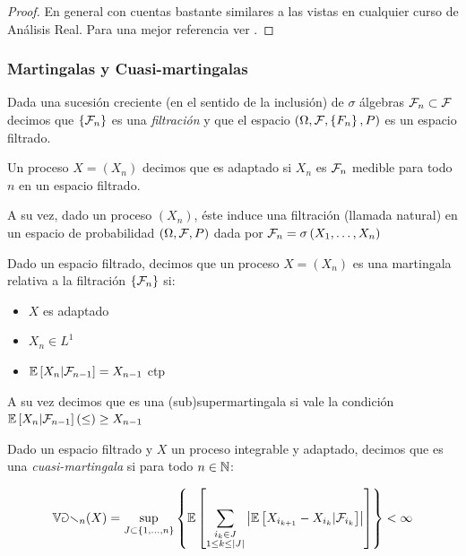 \begin{proof}
	En general con cuentas bastante similares a las vistas en cualquier curso de An\'alisis Real. Para una mejor referencia ver \cite{williams:1991}.
\end{proof}

\subsubsection{Martingalas y Cuasi-martingalas}

\begin{definition}
	Dada una sucesi\'on creciente (en el sentido de la inclusi\'on) de $\sigma$ \'algebras $\mathcal{F}_n \subset \mathcal{F}$ decimos que $\left\lbrace\mathcal{F}_n\right\rbrace$ es una \textit{filtraci\'on} y que el espacio $\left(\Omega, \mathcal{F}, \left\lbrace F_n\right\rbrace, P\right)$ es un espacio filtrado.
	
	Un proceso $X  = \left(X_n\right)$ decimos que es adaptado si $X_n $ es $\mathcal{F}_n$ medible para todo $n$ en un espacio filtrado.
	
	A su vez, dado un proceso $\left(X_n\right)$, \'este induce una filtraci\'on (llamada natural) en un espacio de probabilidad $\left(\Omega, \mathcal{F}, P\right)$ dada por $\mathcal{F}_n = \sigma\left(X_1, \dots, X_n \right)$
	
\end{definition}

\begin{definition}
	Dado un espacio filtrado, decimos que un proceso $X = \left(X_n\right)$ es una martingala relativa a la filtraci\'on $\left\lbrace\mathcal{F}_n\right\rbrace$ si:
	
	\begin{itemize}
		\item $X$ es adaptado
		\item $X_n \in L^1$
		\item $\mathbb{E} \left[X_n \vert \mathcal{F}_{n-1}\right] = X_{n-1}$ ctp
	\end{itemize}

	A su vez decimos que es una (sub)supermartingala si vale la condici\'on $\mathbb{E} \left[X_n \vert \mathcal{F}_{n-1}\right] (\leq)\geq X_{n-1}$
	
\end{definition}

\begin{definition}
	Dado un espacio filtrado y $X$ un proceso integrable y adaptado, decimos que es una \textit{cuasi-martingala} si para todo $n \in {\mathbb{N}}$:
	
	\begin{equation}
		\mathbb{Var}_n(X) = \sup\limits_{J \subset \left\lbrace1, \dots, n\right\rbrace} \left\lbrace\mathbb{E} \left[\sum\limits_{\substack{i_k \in J \\ 1 \leq k \leq \left\lvert J\right\rvert}}{\left\lvert\mathbb{E} \left[X_{i_{k+1}} - X_{i_k} \vert \mathcal{F}_{i_{k}}\right]\right\rvert}\right]\right\rbrace < \infty
	\end{equation}
	
\end{definition}

